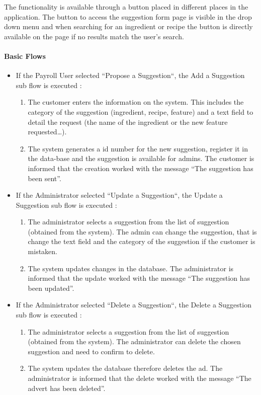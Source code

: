 {
  The functionality is available through a button placed in different places in the application. The button to access the suggestion form page is visible in the drop down menu and when searching for an ingredient or recipe the button is directly available on the page if no results match the user's search.

  \pagebreak

  \paragraph{Basic Flows}
  \begin{itemize}
    \item If the Payroll User selected “Propose a Suggestion“, the Add a Suggestion sub flow is executed :
    \begin{enumerate}
      \item The customer enters the information on the system. This includes the category of the suggestion (ingredient, recipe, feature) and a text field to detail the request (the name of the ingredient or the new feature requested\dots).
      \item The system generates a id number for the new suggestion, register it in the data-base and the suggestion is available for admins. The customer is informed that the creation worked with the message “The suggestion has been sent”.
    \end{enumerate}
    \item If the Administrator selected “Update a Suggestion“, the Update a Suggestion sub flow is executed :
    \begin{enumerate}
      \item The administrator selects a suggestion from the list of suggestion (obtained from the system). The admin can change the suggestion, that is change the text field and the category of the suggestion if the customer is mistaken.
      \item The system updates changes in the database. The administrator is informed that the update worked with the message “The suggestion has been updated”.
    \end{enumerate}
    \item If the Administrator selected “Delete a Suggestion“, the Delete a Suggestion sub flow is executed :
    \begin{enumerate}
      \item The administrator selects a suggestion from the list of suggestion (obtained from the system). The administrator can delete the chosen suggestion and need to confirm to delete.
      \item The system updates the database therefore deletes the ad. The administrator is informed that the delete worked with the message “The advert has been deleted”.
    \end{enumerate}
  \end{itemize}

}

